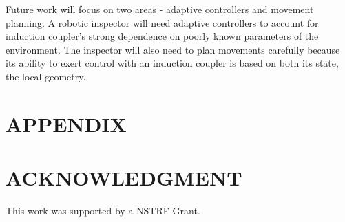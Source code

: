 \documentclass[letterpaper, 10 pt, conference]{ieeeconf}  %
\begin{document}
Future work will focus on two areas - adaptive controllers and movement planning. A robotic inspector will need adaptive controllers to account for induction coupler's strong dependence on poorly known parameters of the environment.  The inspector will also need to plan movements carefully because its ability to exert control with an induction coupler is based on both its state, the local geometry.      





   


\addtolength{\textheight}{-12cm}   %







\section*{APPENDIX}

\section*{ACKNOWLEDGMENT}
This work was supported by a NSTRF Grant.







\end{document}
